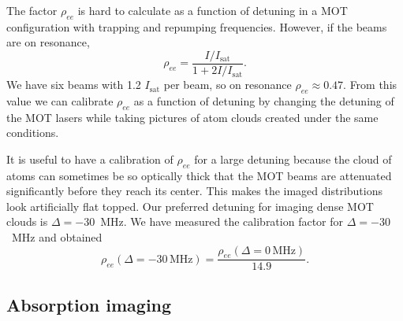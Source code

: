 \documentclass[oneside,12pt]{memoir}
\newcommand{\isat}{ \ensuremath{ I_{\mathrm{sat}} } }
\begin{document}
The factor $\rho_{ee}$ is hard to calculate as a function of detuning in a MOT
configuration with trapping and repumping frequencies.  However, if the beams
are on resonance, \[ \rho_{ee} =  \frac{I/\isat}{1+2I/\isat} .\] We have six
beams with 1.2\isat per beam, so on resonance $\rho_{ee}\approx 0.47$.  From
this value we can calibrate $\rho_{ee}$ as a function of detuning by changing
the detuning of the MOT lasers while taking pictures of atom clouds created
under the same conditions. 

It is useful to have a calibration of $\rho_{ee}$ for a large detuning because
the cloud of atoms can sometimes be so optically thick that the MOT beams are
attenuated significantly before they reach its center.  This makes the imaged
distributions look artificially flat topped.  Our preferred detuning for
imaging dense MOT clouds is $\Delta=-30$~MHz.  We have measured the calibration
factor for $\Delta=-30$~MHz and obtained \[ \rho_{ee}(
\Delta=-30\,\mathrm{MHz}) = \frac{\rho_{ee}( \Delta=0\,\mathrm{MHz})}{14.9}.\] 




\subsection{Absorption imaging}
\label{subsec:absorption}
\end{document}
